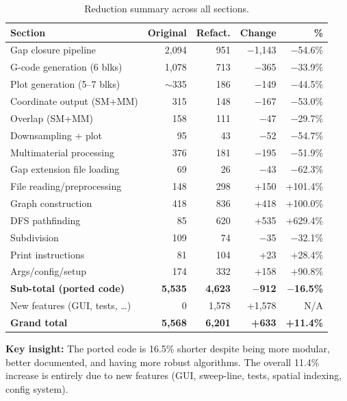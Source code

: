 \documentclass[11pt,letterpaper]{article}
\begin{document}
\begin{table}[h]
\centering
\small
\begin{tabularx}{\textwidth}{X r r r r}
\toprule
\textbf{Section} & \textbf{Original} & \textbf{Refact.} & \textbf{Change} & \textbf{\%} \\
\midrule
Gap closure pipeline        & 2,094  & 951   & $-$1,143 & $-$54.6\% \\
G-code generation (6 blks)  & 1,078  & 713   & $-$365   & $-$33.9\% \\
Plot generation (5--7 blks)  & $\sim$335 & 186 & $-$149   & $-$44.5\% \\
Coordinate output (SM+MM)   & 315    & 148   & $-$167   & $-$53.0\% \\
Overlap (SM+MM)             & 158    & 111   & $-$47    & $-$29.7\% \\
Downsampling + plot         & 95     & 43    & $-$52    & $-$54.7\% \\
Multimaterial processing    & 376    & 181   & $-$195   & $-$51.9\% \\
Gap extension file loading  & 69     & 26    & $-$43    & $-$62.3\% \\
File reading/preprocessing  & 148    & 298   & +150     & +101.4\% \\
Graph construction          & 418    & 836   & +418     & +100.0\% \\
DFS pathfinding             & 85     & 620   & +535     & +629.4\% \\
Subdivision                 & 109    & 74    & $-$35    & $-$32.1\% \\
Print instructions          & 81     & 104   & +23      & +28.4\% \\
Args/config/setup           & 174    & 332   & +158     & +90.8\% \\
\midrule
\textbf{Sub-total (ported code)} & \textbf{5,535} & \textbf{4,623} & \textbf{$-$912} & \textbf{$-$16.5\%} \\
New features (GUI, tests, \ldots) & 0 & 1,578 & +1,578 & N/A \\
\midrule
\textbf{Grand total}        & \textbf{5,568} & \textbf{6,201} & \textbf{+633} & \textbf{+11.4\%} \\
\bottomrule
\end{tabularx}
\caption{Reduction summary across all sections.}
\end{table}

\textbf{Key insight:} The ported code is 16.5\% shorter despite being more modular, better documented, and having more robust algorithms. The overall 11.4\% increase is entirely due to new features (GUI, sweep-line, tests, spatial indexing, config system).
\end{document}
